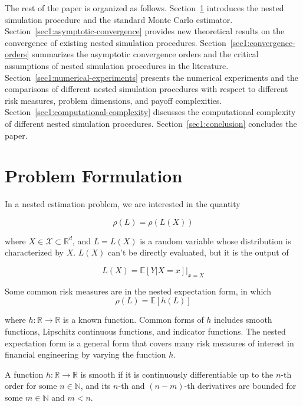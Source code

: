 The rest of the paper is organized as follows.
Section~\ref{sec1:problem-formulation} introduces the nested simulation procedure and the standard Monte Carlo estimator.
Section~\ref{sec1:asymptotic-convergence} provides new theoretical results on the convergence of existing nested simulation procedures.
Section~\ref{sec1:convergence-orders} summarizes the asymptotic convergence orders and the critical assumptions of nested simulation procedures in the literature.
Section~\ref{sec1:numerical-experiments} presents the numerical experiments and the comparisons of different nested simulation procedures with respect to different risk measures, problem dimensions, and payoff complexities.
Section~\ref{sec1:computational-complexity} discusses the computational complexity of different nested simulation procedures.
Section~\ref{sec1:conclusion} concludes the paper.

\section{Problem Formulation} \label{sec1:problem-formulation}

In a nested estimation problem, we are interested in the quantity 

$$\rho(L) = \rho(L(X))$$

where $X \in \mathcal{X} \subset \mathbb{R}^d$, and $L = L(X)$ is a random variable whose distribution is characterized by $X$.
$L(X)$ can't be directly evaluated, but it is the output of 

$$ L(X) = \mathbb{E}\left[ Y|X=x \right]\vert_{x=X} $$

Some common risk measures are in the nested expectation form, in which 
$$\rho(L) = \mathbb{E}\left[ h(L) \right]$$

where $h: \mathbb{R} \rightarrow \mathbb{R}$ is a known function. 
Common forms of $h$ includes smooth functions, Lipschitz continuous functions, and indicator functions.
The nested expectation form is a general form that covers many risk measures of interest in financial engineering by varying the function $h$.

\begin{definition} \label{def1:smooth}
    A function $h: \mathbb{R} \rightarrow \mathbb{R}$ is smooth if it is continuously differentiable up to the $n$-th order for some $n \in \mathbb{N}$, 
    and its $n$-th and $(n-m)$-th derivatives are bounded for some $m \in \mathbb{N}$ and $m < n$.
\end{definition}

